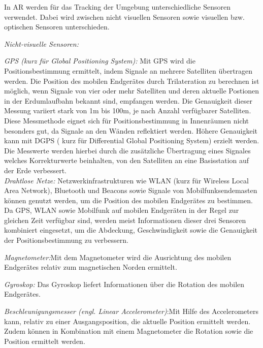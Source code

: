 In AR werden für das Tracking der Umgebung unterschiedliche Sensoren verwendet. Dabei wird zwischen nicht visuellen Sensoren sowie visuellen bzw. optischen Sensoren  unterschieden. 

\textit{Nicht-visuelle Sensoren:}  

\textit{GPS (kurz für Global Positioning System):} Mit GPS wird die Positionsbestimmung ermittelt, indem Signale an mehrere Satelliten übertragen werden. Die Position des mobilen Endgerätes durch Trilateration zu berechnen ist 
möglich, wenn Signale von vier oder mehr Satelliten und deren aktuelle Postionen in der Erdumlaufbahn bekannt sind, empfangen werden. Die Genauigkeit dieser Messung variiert stark von 1m bis 100m, je nach Anzahl verfügbarer Satelliten. 
\cite[S.~2]{Arora2017}\cite[S.~100]{DieterSchmalstieg2016} Diese Messmethode eignet sich für Positionsbestimmung in Innenräumen nicht besonders gut, da Signale an den Wänden reflektiert werden. 
Höhere Genauigkeit kann mit  DGPS ( kurz für Differential Global Positioning System) erzielt werden. Die Messwerte werden hierbei durch die zusätzliche Übertragung eines Signales welches Korrekturwerte beinhalten, von den Satelliten an eine Basisstation auf der Erde verbessert. \\

\textit{Drahtlose Netze:} Netzwerkinfrastrukturen wie WLAN (kurz für Wireless Local Area Network), Bluetooth und Beacons sowie Signale von Mobilfunksendemasten können genutzt werden, um die Position des mobilen Endgerätes zu bestimmen. \cite[S.~101]{DieterSchmalstieg2016}
Da GPS, WLAN sowie Mobilfunk auf mobilen Endgeräten in der Regel zur gleichen Zeit verfügbar sind, werden meist Informationen dieser drei Sensoren kombiniert eingesetzt, um die Abdeckung, Geschwindigkeit sowie die
Genauigkeit der Positionsbestimmung zu verbessern. 

\textit{Magnetometer:}Mit dem Magnetometer wird die Ausrichtung des mobilen Endgerätes relativ zum magnetischen Norden ermittelt. \cite[S.~102]{DieterSchmalstieg2016} 

\textit{Gyroskop: } Das Gyroskop liefert Informationen über die Rotation des mobilen Endgerätes. 

\textit{Beschleunigungsmesser (engl. Linear Accelerometer)}:Mit Hilfe des Accelerometers kann, relativ zu einer Ausgangsposition, die aktuelle Position ermittelt werden. Zudem können in Kombination mit einem Magnetometer
die Rotation sowie die Position ermittelt werden. \cite[S.~104]{DieterSchmalstieg2016} 

